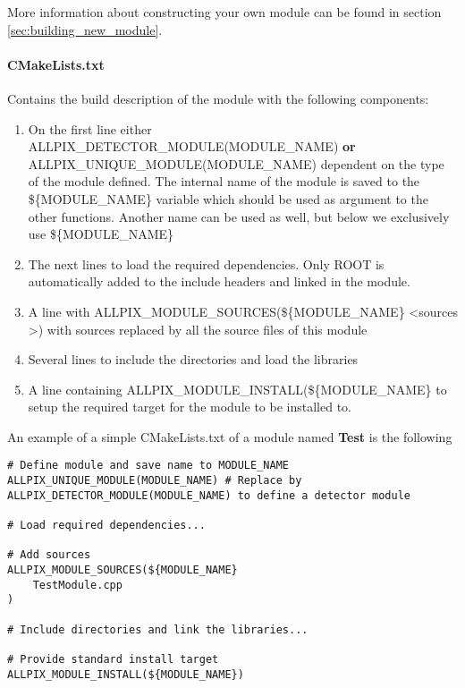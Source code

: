More information about constructing your own module can be found in section \ref{sec:building_new_module}.

\paragraph{CMakeLists.txt}
Contains the build description of the module with the following components:
\begin{enumerate}
\item On the first line either ALLPIX\_DETECTOR\_MODULE(MODULE\_NAME) \textbf{or} \\ ALLPIX\_UNIQUE\_MODULE(MODULE\_NAME) dependent on the type of the module defined. The internal name of the module is saved to the \$\{MODULE\_NAME\} variable which should be used as argument to the other functions. Another name can be used as well, but below we exclusively use \$\{MODULE\_NAME\}
\item The next lines to load the required dependencies. Only ROOT is automatically added to the include headers and linked in the module.
\item A line with ALLPIX\_MODULE\_SOURCES(\$\{MODULE\_NAME\} \textless sources \textgreater) with sources replaced by all the source files of this module
\item Several lines to include the directories and load the libraries
\item A line containing ALLPIX\_MODULE\_INSTALL(\$\{MODULE\_NAME\} to setup the required target for the module to be installed to.
\end{enumerate}

An example of a simple CMakeLists.txt of a module named \textbf{Test} is the following
\vspace{5pt}

\begin{verbatim}
# Define module and save name to MODULE_NAME
ALLPIX_UNIQUE_MODULE(MODULE_NAME) # Replace by ALLPIX_DETECTOR_MODULE(MODULE_NAME) to define a detector module

# Load required dependencies...

# Add sources
ALLPIX_MODULE_SOURCES(${MODULE_NAME} 
    TestModule.cpp
)

# Include directories and link the libraries...

# Provide standard install target
ALLPIX_MODULE_INSTALL(${MODULE_NAME})
\end{verbatim}

